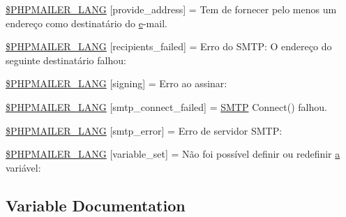 \begin{DoxyCompactItemize}
\hyperlink{phpmailer_8lang-pt_8php_a8b97897c2406b7392b056f375feeefbb}{\$\+P\+H\+P\+M\+A\+I\+L\+E\+R\+\_\+\+L\+A\+NG} \mbox{[}\textquotesingle{}provide\+\_\+address\textquotesingle{}\mbox{]} = \textquotesingle{}Tem de fornecer pelo menos um endereço como destinatário do \hyperlink{jquery-ui_8min_8js_abea95a4e94bc6f4151d5683d4c12c3f4}{e}-\/mail.\textquotesingle{}
\item 
\hyperlink{phpmailer_8lang-pt_8php_a7589d30bb9b368327c2df015f3e6bcba}{\$\+P\+H\+P\+M\+A\+I\+L\+E\+R\+\_\+\+L\+A\+NG} \mbox{[}\textquotesingle{}recipients\+\_\+failed\textquotesingle{}\mbox{]} = \textquotesingle{}Erro do S\+M\+T\+P\+: O endereço do seguinte destinatário falhou\+: \textquotesingle{}
\item 
\hyperlink{phpmailer_8lang-pt_8php_a68e437bdb9b968a5a67320f03d231565}{\$\+P\+H\+P\+M\+A\+I\+L\+E\+R\+\_\+\+L\+A\+NG} \mbox{[}\textquotesingle{}signing\textquotesingle{}\mbox{]} = \textquotesingle{}Erro ao assinar\+: \textquotesingle{}
\item 
\hyperlink{phpmailer_8lang-pt_8php_a7b321d4ca1e9df702403ed4c61aa0980}{\$\+P\+H\+P\+M\+A\+I\+L\+E\+R\+\_\+\+L\+A\+NG} \mbox{[}\textquotesingle{}smtp\+\_\+connect\+\_\+failed\textquotesingle{}\mbox{]} = \textquotesingle{}\hyperlink{class_s_m_t_p}{S\+M\+TP} Connect() falhou.\textquotesingle{}
\item 
\hyperlink{phpmailer_8lang-pt_8php_a7d9cffba1e669c845f8a4c891ee50064}{\$\+P\+H\+P\+M\+A\+I\+L\+E\+R\+\_\+\+L\+A\+NG} \mbox{[}\textquotesingle{}smtp\+\_\+error\textquotesingle{}\mbox{]} = \textquotesingle{}Erro de servidor S\+M\+T\+P\+: \textquotesingle{}
\item 
\hyperlink{phpmailer_8lang-pt_8php_af795debc7a739d038742691c358d9032}{\$\+P\+H\+P\+M\+A\+I\+L\+E\+R\+\_\+\+L\+A\+NG} \mbox{[}\textquotesingle{}variable\+\_\+set\textquotesingle{}\mbox{]} = \textquotesingle{}Não foi possível definir ou redefinir \hyperlink{_chart_8min_8js_aef3b685c08bc6c76c8e729bd0e93901d}{a} variável\+: \textquotesingle{}
\end{DoxyCompactItemize}


\subsection{Variable Documentation}
